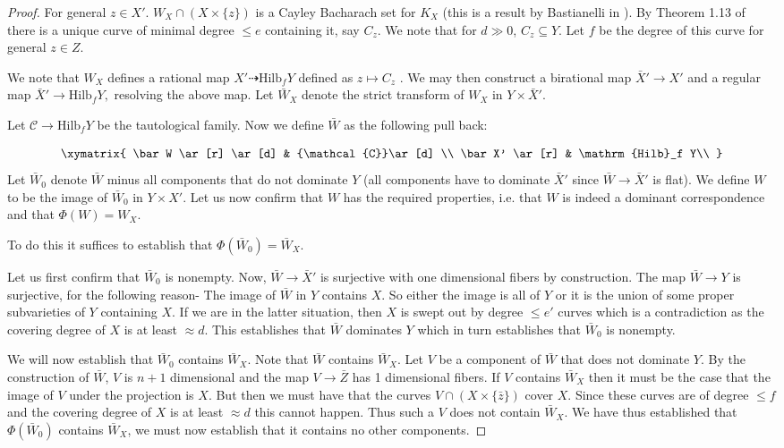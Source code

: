 \documentclass[12pt]{amsart}
\numberwithin{equation}{section}
\numberwithin{theorem}{section}
\theoremstyle{definition}
\theoremstyle{definition}
\def\CCal{{\mathcal{C}}}
\def\dra{{\dashrightarrow}}
\newcommand{\Hilb}{\mathrm{Hilb}}
\begin{document}
\begin{proof}
   For general $z \in X'$. $W_X \cap (X \times \{z\})$ is  a Cayley Bacharach set for $K_X$  (this is a result by Bastianelli in \cite{Bast}). By Theorem 1.13 of \cite{Ban} there is a unique curve of minimal degree $\le e$ containing it, say $C_z$. We note that for $d \gg 0$, $C_z \subseteq Y$. Let $f$ be the degree of this curve for general $z \in Z$.

        We note that $W_X$ defines a rational map $X' \dra \Hilb_f Y$ defined as $z \mapsto C_z$ . We may then construct a birational map  $\bar X' \to X'$ and a regular map $\bar X' \to \Hilb_f Y,$ resolving the above map. Let $\bar W_X$ denote the strict transform of $W_X$ in $Y \times \bar X'.$
    
    Let $\CCal \to \Hilb_f Y$ be the tautological family.
    Now we define $\bar W$ as the following pull back:

    \[
    \xymatrix{
     \bar W \ar[r] \ar[d] & \CCal \ar[d] \\
      \bar X' \ar[r]        &  \Hilb_f Y\\
    }
    \]
    Let $\bar W_0$ denote $\bar W$ minus all components that do not dominate $Y$ (all components have to dominate $\bar X'$ since $\bar W \to \bar X'$ is flat). 
     We define $W$ to be the image of  $\bar W_0$  in $Y \times X'$. Let us now confirm that $W$ has the required properties, i.e. that $W$ is indeed a dominant correspondence and that $\Phi (W) = W_X$.

         To do this  it suffices to establish that $\Phi(\bar W_0) = \bar W_X$.
    
    
    
    Let us first confirm that $\bar W_0$ is nonempty. Now,  $\bar W \to \bar X'$ is surjective  with one dimensional fibers by construction. The  map $\bar W \to Y$ is surjective, for the following reason- The image of $\bar W$ in $Y$ contains $X$. So either the image is all of $Y$ or it is the union of some proper subvarieties of $Y$ containing $X$. If we are in the latter situation, then $X$ is swept out by degree $\le e'$ curves which is a contradiction as the covering degree of $X$ is at least $\approx d$.  This establishes that $\bar W$ dominates $Y$ which in turn establishes that $\bar W_0$ is nonempty.

    We will now establish that $\bar W_0 $ contains $\bar W_X$. Note that  $\bar W$    contains $\bar W_X$. Let $V$ be a component of $\bar W$ that does not dominate $Y$. By  the construction of $\bar W$, $V$ is $n+1$ dimensional and the map $V \to \bar Z$ has 1 dimensional fibers. If $V$ contains $ \bar W_X$ then it must be the case that the image of $V$ under the projection is $X$. But then we must have that the curves $V \cap (X \times \{\bar z\})$ cover $X$. Since these curves are of degree $\le f$ and the covering degree of $X$ is at least $\approx d$ this cannot happen. Thus such a $V$ does not contain $\bar W_X$.
    We have thus established that $\Phi(\bar W_0)$  contains $\bar W_X$, we must now establish that it contains no other components.
    



\end{proof}
\end{document}
